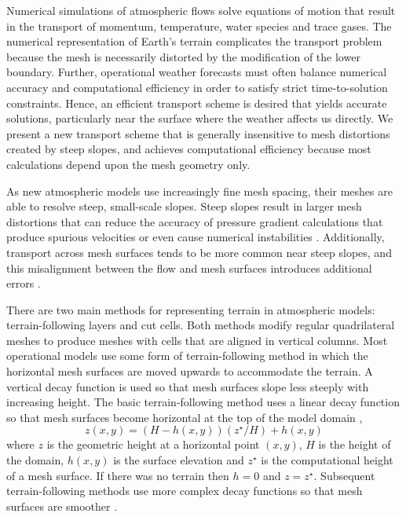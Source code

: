 Numerical simulations of atmospheric flows solve equations of motion that result in the transport of momentum, temperature, water species and trace gases.  The numerical representation of Earth's terrain complicates the transport problem because the mesh is necessarily distorted by the modification of the lower boundary.  Further, operational weather forecasts must often balance numerical accuracy and computational efficiency in order to satisfy strict time-to-solution constraints.  Hence, an efficient transport scheme is desired that yields accurate solutions, particularly near the surface where the weather affects us directly.
We present a new transport scheme that is generally insensitive to mesh distortions created by steep slopes, and achieves computational efficiency because most calculations depend upon the mesh geometry only.

As new atmospheric models use increasingly fine mesh spacing, their meshes are able to resolve steep, small-scale slopes.  Steep slopes result in larger mesh distortions that can reduce the accuracy of pressure gradient calculations \citep{klemp2011} that produce spurious velocities \citep{zaengl2004} or even cause numerical instabilities \citep{webster2003}.  Additionally, transport across mesh surfaces tends to be more common near steep slopes, and this misalignment between the flow and mesh surfaces introduces additional errors \citep{schaer2002,shaw-weller2016}.

There are two main methods for representing terrain in atmospheric models: terrain-following layers and cut cells.  Both methods modify regular quadrilateral meshes to produce meshes with cells that are aligned in vertical columns.  Most operational models use some form of terrain-following method in which the horizontal mesh surfaces are moved upwards to accommodate the terrain.  A vertical decay function is used so that mesh surfaces slope less steeply with increasing height.  The basic terrain-following method uses a linear decay function so that mesh surfaces become horizontal at the top of the model domain \citep{galchen-somerville1975},
\begin{equation}
	z(x,y) = \left( H - h(x,y) \right) \left( z^\star / H \right) + h(x,y) \label{eqn:btf}
\end{equation}
where $z$ is the geometric height at a horizontal point $(x, y)$, $H$ is the height of the domain, $h(x,y)$ is the surface elevation and $z^\star$ is the computational height of a mesh surface.  If there was no terrain then $h = 0$ and $z = z^\star$.
Subsequent terrain-following methods use more complex decay functions so that mesh surfaces are smoother \citep{simmons-burridge1981,schaer2002,leuenberger2010,klemp2011}.

